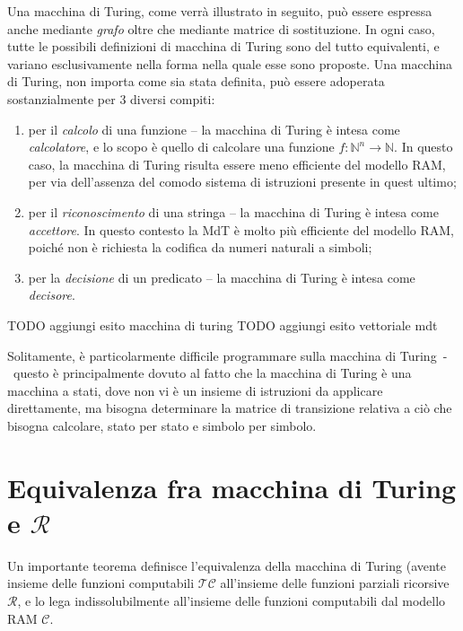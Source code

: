 \documentclass[10pt]{book}
\begin{document}
Una macchina di Turing, come verrà illustrato in seguito, può essere espressa
anche mediante \emph{grafo} oltre che mediante matrice di sostituzione. In ogni
caso, tutte le possibili definizioni di macchina di Turing sono del tutto
equivalenti, e variano esclusivamente nella forma nella quale esse sono
proposte. Una macchina di Turing, non importa come sia stata definita, può
essere adoperata sostanzialmente per $3$ diversi compiti:
\begin{enumerate}
    \item per il \emph{calcolo} di una funzione \--- la macchina di Turing è
        intesa come \emph{calcolatore}, e lo scopo è quello di calcolare una
        funzione $f: \mathbb{N}^n \rightarrow \mathbb{N}$. In questo caso, la
        macchina di Turing risulta essere meno efficiente del modello RAM, per
        via dell'assenza del comodo sistema di istruzioni presente in quest
        ultimo;
    \item per il \emph{riconoscimento} di una stringa \--- la macchina di
        Turing è intesa come \emph{accettore}. In questo contesto la MdT è
        molto più efficiente del modello RAM, poiché non è richiesta la
        codifica da numeri naturali a simboli;
    \item per la \emph{decisione} di un predicato \--- la macchina di Turing è
        intesa come \emph{decisore}.
\end{enumerate}

TODO aggiungi esito macchina di turing
TODO aggiungi esito vettoriale mdt

Solitamente, è particolarmente difficile programmare sulla macchina di
Turing~\--~questo è principalmente dovuto al fatto che la macchina di Turing è
una macchina a stati, dove non vi è un insieme di istruzioni da applicare
direttamente, ma bisogna determinare la matrice di transizione relativa a ciò
che bisogna calcolare, stato per stato e simbolo per simbolo.


\section{Equivalenza fra macchina di Turing e $\mathcal R$}

Un importante teorema definisce l'equivalenza della macchina di Turing (avente
insieme delle funzioni computabili $\mathcal{TC}$ all'insieme delle funzioni
parziali ricorsive $\mathcal R$, e lo lega indissolubilmente all'insieme delle
funzioni computabili dal modello RAM $\mathcal C$.
\end{document}
